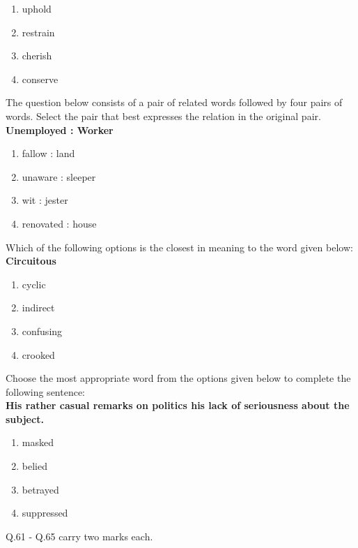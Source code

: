     \begin{enumerate}
        \item uphold
        \item restrain
        \item cherish
        \item conserve
    \end{enumerate}
    \item The question below consists of a pair of related words followed by four pairs of words. Select the pair that best expresses the relation in the original pair.\\ \textbf{Unemployed : Worker}
    \begin{enumerate}
        \item fallow : land
        \item unaware : sleeper
        \item wit : jester
        \item renovated : house
    \end{enumerate}
    \item Which of the following options is the closest in meaning to the word given below:\\ \textbf{Circuitous}
    \begin{enumerate}
        \item cyclic
        \item indirect
        \item confusing
        \item crooked
    \end{enumerate}
    \item Choose the most appropriate word from the options given below to complete the following sentence:\\ \textbf{His rather casual remarks on politics \underline{\hspace{2cm}} his lack of seriousness about the subject.} 
    \begin{enumerate}
        \item masked
        \item belied
        \item betrayed
        \item suppressed
    \end{enumerate}
    Q.61 - Q.65 carry two marks each.\\
    
